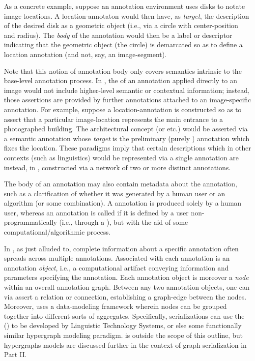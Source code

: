 {\begin{description}
As a concrete example, suppose an annotation environment 
uses disks to notate image locations.  A location-annotaton 
would then have, as \textit{target}, the description 
of the desired disk as a geometric object (i.e., 
via a circle with center-position and radius).  
The \textit{body} of the annotation would then 
be a label or descriptor indicating that the 
geometric object (the circle) is demarcated 
so as to define a location annotation (and not, 
say, an image-segment).

Note that this notion of annotation body only 
covers semantics intrinsic to the base-level 
annotation process.  In \AXFI{}, the  
of an annotation applied directly to an 
image would not include higher-level semantic 
or contextual information; instead, those 
assertions are provided by further annotations 
attached to an image-specific annotation.  For 
example, suppose a location-annotation is 
constructed so as to assert that a particular 
image-location represents the main entrance to 
a photographed building.  The architectural 
concept  (or  etc.) 
would be asserted via a semantic annotation 
whose \textit{target} is the preliminary 
(purely ) annotation which fixes 
the location.  These paradigms imply that certain 
descriptions which in other contexts (such 
as linguistics) would be represented via 
a single annotation are instead, in \AXFI{}, 
constructed via a network of two or 
more distinct annotations.

\label{ph:man}The body of an annotation 
may also contain metadata about the annotation, 
such as a clarification of whether it was 
generated by a human user or an algorithm 
(or some combination).  A  annotation 
is produced solely by a human user, whereas 
an annotation is called  
if it is defined by a user non-programmatically 
(i.e., through a \GUI{}), but with the aid of 
some computational/algorithmic process. 

\item[Annotation Graphs]  In \AXFI{}, as 
just alluded to, complete information about 
a specific annotation often spreads 
across multiple annotations.  
Associated with each annotation is an 
annotation \textit{object}, i.e., a 
computational artifact conveying information 
and parameters specifying the annotation.  
Each annotation object is moreover a \textit{node} 
within an overall annotation graph.  Between 
any two annotation objects, one can via 
\AXFI{} assert a relation or connection, 
establishing a graph-edge between the nodes.  
Moreover, \AXFI{} uses a  
data-modeling framework wherein nodes 
can be grouped together into different sorts 
of aggregates.  Specifically, \AXFI{} 
serializations can use the  (\HGXF{}) to be developed 
by Linguistic Technology Systems, or 
else some functionally similar hypergraph 
modeling paradigm.  
\lHGXF{} is outside the scope of this 
outline, but hypergraphs models are discussed further 
in the context of graph-serialization in 
Part II.  


\end{description}}
